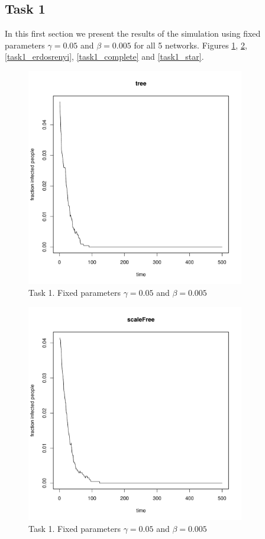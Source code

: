 \documentclass[paper=a4, fontsize=11pt]{scrartcl} %
\begin{document}
\subsection{Task 1}
In this first section we present the results of the simulation using fixed parameters $\gamma=0.05$ and $\beta=0.005$ for all 5 networks.  Figures \ref{task1_tree}, \ref{task1_scaleFree}, \ref{task1_erdosrenyi}, \ref{task1_complete} and \ref{task1_star}.
\begin{figure}[!h] %
   \centering
   \includegraphics[width=0.85\textwidth]{task1_tree} 
   \caption{Task 1. Fixed parameters $\gamma=0.05$ and $\beta=0.005$}
   \label{task1_tree}
\end{figure}
\begin{figure}[!h] %
   \centering
   \includegraphics[width=0.85\textwidth]{task1_scaleFree}
\caption{Task 1. Fixed parameters $\gamma=0.05$ and $\beta=0.005$} 
\label{task1_scaleFree}
\end{figure}
\end{document}
